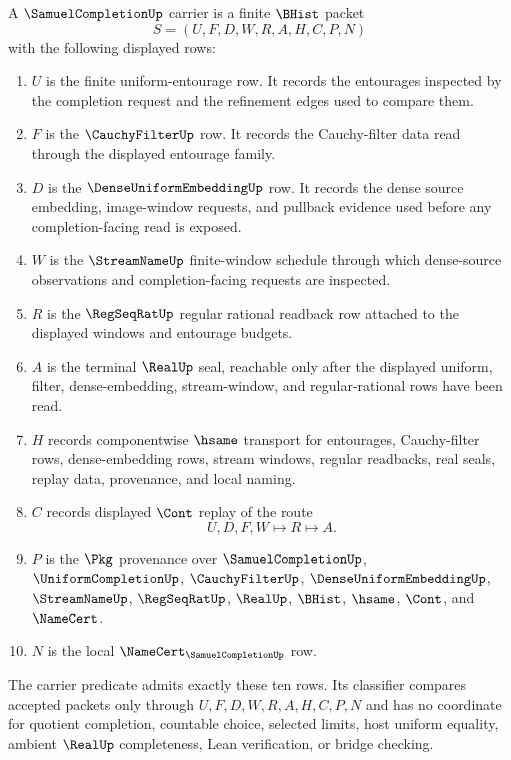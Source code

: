 \begin{definition}
\label{def:samuel-completion-carrier}
A $\SamuelCompletionUp$ carrier is a finite $\BHist$ packet
$$
S=(U,F,D,W,R,A,H,C,P,N)
$$
with the following displayed rows:
\begin{enumerate}
\item $U$ is the finite uniform-entourage row. It records the entourages inspected by the completion request and the refinement edges used to compare them.
\item $F$ is the $\CauchyFilterUp$ row. It records the Cauchy-filter data read through the displayed entourage family.
\item $D$ is the $\DenseUniformEmbeddingUp$ row. It records the dense source embedding, image-window requests, and pullback evidence used before any completion-facing read is exposed.
\item $W$ is the $\StreamNameUp$ finite-window schedule through which dense-source observations and completion-facing requests are inspected.
\item $R$ is the $\RegSeqRatUp$ regular rational readback row attached to the displayed windows and entourage budgets.
\item $A$ is the terminal $\RealUp$ seal, reachable only after the displayed uniform, filter, dense-embedding, stream-window, and regular-rational rows have been read.
\item $H$ records componentwise $\hsame$ transport for entourages, Cauchy-filter rows, dense-embedding rows, stream windows, regular readbacks, real seals, replay data, provenance, and local naming.
\item $C$ records displayed $\Cont$ replay of the route
$$
U,D,F,W \longmapsto R \longmapsto A .
$$
\item $P$ is the $\Pkg$ provenance over $\SamuelCompletionUp$, $\UniformCompletionUp$, $\CauchyFilterUp$, $\DenseUniformEmbeddingUp$, $\StreamNameUp$, $\RegSeqRatUp$, $\RealUp$, $\BHist$, $\hsame$, $\Cont$, and $\NameCert$.
\item $N$ is the local $\NameCert_{\SamuelCompletionUp}$ row.
\end{enumerate}
The carrier predicate admits exactly these ten rows. Its classifier compares accepted packets only through $U,F,D,W,R,A,H,C,P,N$ and has no coordinate for quotient completion, countable choice, selected limits, host uniform equality, ambient $\RealUp$ completeness, Lean verification, or bridge checking.
\end{definition}

